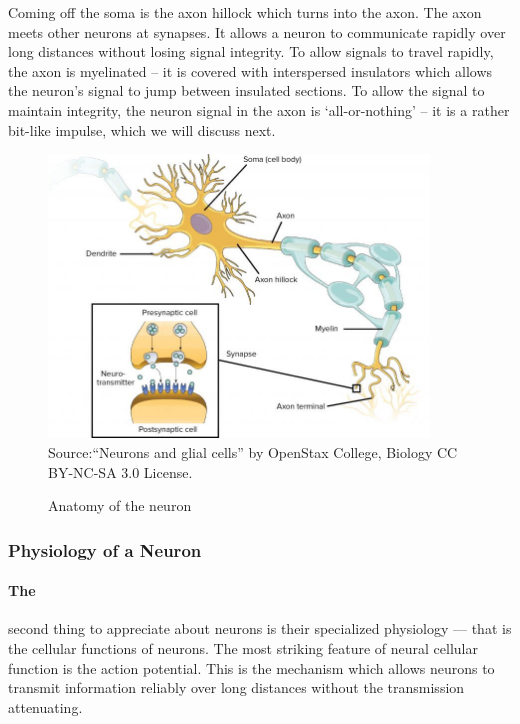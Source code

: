 \documentclass[paper=a4, fontsize=11pt]{scrartcl} %
\numberwithin{equation}{section} %
\numberwithin{figure}{section} %
\numberwithin{table}{section} %
\begin{document}
\vspace{10pt}
Coming off the soma is the axon hillock which turns into the axon. The axon meets other neurons at synapses. It allows a neuron to communicate rapidly over long distances without losing signal integrity. To allow signals to travel rapidly, the axon is myelinated – it is covered with interspersed insulators which allows the neuron’s signal to jump between insulated sections. To allow the signal to maintain integrity, the neuron signal in the axon is ‘all-or-nothing’ – it is a rather bit-like impulse, which we will discuss next.


\begin{figure}[H]
    \centering
    \caption{Anatomy of the neuron}
    \includegraphics[width=0.9\textwidth]{./data/neural.jpg}
    \footnotesize{Source:“Neurons and glial cells” by OpenStax College, Biology CC BY-NC-SA 3.0 License.}
    \label{fig:my_picture}
\end{figure}


\subsubsection{Physiology of a Neuron}
\paragraph{The}

 second thing to appreciate about neurons is their specialized physiology — that is the cellular functions of neurons. The most striking feature of neural cellular function is the action potential. This is the mechanism which allows neurons to transmit information reliably over long distances without the transmission attenuating.
\end{document}
